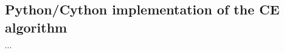 \begin{appendices}
\chapter{Python/Cython implementation of the CE algorithm}
$\cdots$
\end{appendices}